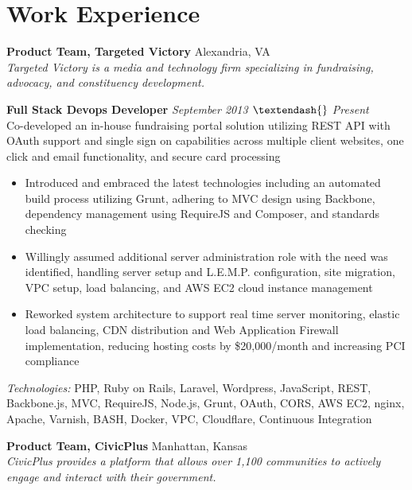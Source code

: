\documentclass[10pt]{article}
\begin{document}
\section*{Work Experience}
\textbf{Product Team, Targeted Victory} \hfill Alexandria, VA \\
\textit{Targeted Victory is a media and technology firm specializing in fundraising, advocacy, and constituency development.} \\
\begin{addmargin}[1em]{0em}
  \textbf{Full Stack Devops Developer} \hfill \textit{September 2013 $\textendash{}$ Present} \\
  Co-developed an in-house fundraising portal solution utilizing REST API with OAuth support and single sign on capabilities across multiple client websites, one click and email functionality, and secure card processing \\
  \vspace{-1em}
  \begin{itemize}
    \item Introduced and embraced the latest technologies including an automated build process utilizing Grunt, adhering to MVC design using Backbone, dependency management using RequireJS and Composer, and standards checking
    \item Willingly assumed additional server administration role with the need was identified, handling server setup and L.E.M.P. configuration, site migration, VPC setup, load balancing, and AWS EC2 cloud instance management
    \item Reworked system architecture to support real time server monitoring, elastic load balancing, CDN distribution and Web Application Firewall implementation, reducing hosting costs by \$20,000/month and increasing PCI compliance
  \end{itemize}
  \textit{Technologies:} PHP, Ruby on Rails, Laravel, Wordpress, JavaScript, REST, Backbone.js, MVC, RequireJS, Node.js, Grunt, OAuth, CORS, AWS EC2, nginx, Apache, Varnish, BASH, Docker, VPC, Cloudflare, Continuous Integration
\end{addmargin}
\textbf{Product Team, CivicPlus} \hfill Manhattan, Kansas \\
\textit{CivicPlus provides a platform that allows over 1,100 communities to actively engage and interact with their government.} \\
\end{document}
